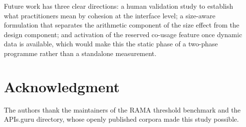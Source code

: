 \documentclass[journal]{IEEEtran}
\begin{document}
Future work has three clear directions: a human validation study to establish
what practitioners mean by cohesion at the interface level; a size-aware
formulation that separates the arithmetic component of the size effect from the
design component; and activation of the reserved co-usage feature once dynamic
data is available, which would make this the static phase of a two-phase
programme rather than a standalone measurement.

\section*{Acknowledgment}
The authors thank the maintainers of the RAMA threshold benchmark and the
APIs.guru directory, whose openly published corpora made this study possible.

\balance


\end{document}
